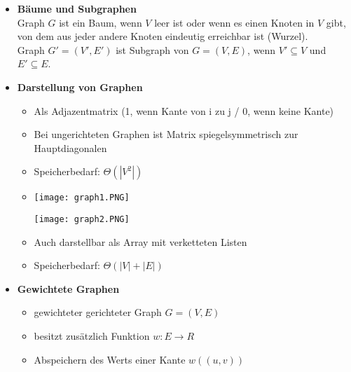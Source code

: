 \begin{itemize}
        \item \textbf{Bäume und Subgraphen} \\
            Graph $G$ ist ein Baum, wenn $V$ leer ist oder wenn es einen Knoten in $V$ gibt, \\
            von dem aus jeder andere Knoten eindeutig erreichbar ist (Wurzel). \\
            Graph $G'=(V',E')$ ist Subgraph von $G=(V,E)$, wenn $V'\subseteq V$ und $E' \subseteq E$.

        \item \textbf{Darstellung von Graphen}
            \begin{itemize}
                \item Als Adjazentmatrix (1, wenn Kante von i zu j / 0, wenn keine Kante)
                \item Bei ungerichteten Graphen ist Matrix spiegelsymmetrisch zur Hauptdiagonalen
                \item Speicherbedarf: $\Theta(|V^2|)$
                \item[]
                    \begin{minipage}{0.45\textwidth}
                        \texttt{[image: graph1.PNG]}
                    \end{minipage}
                    \begin{minipage}{0.45\textwidth}
                        \texttt{[image: graph2.PNG]}
                    \end{minipage}
                \item Auch darstellbar als Array mit verketteten Listen
                \item Speicherbedarf: $\Theta(|V| + |E|)$
            \end{itemize}

        \item \textbf{Gewichtete Graphen}
            \begin{itemize}
                \item gewichteter gerichteter Graph $G=(V,E)$
                \item besitzt zusätzlich Funktion $w: E \rightarrow R$
                \item Abspeichern des Werts einer Kante $w((u,v))$
            \end{itemize}
    \end{itemize}

